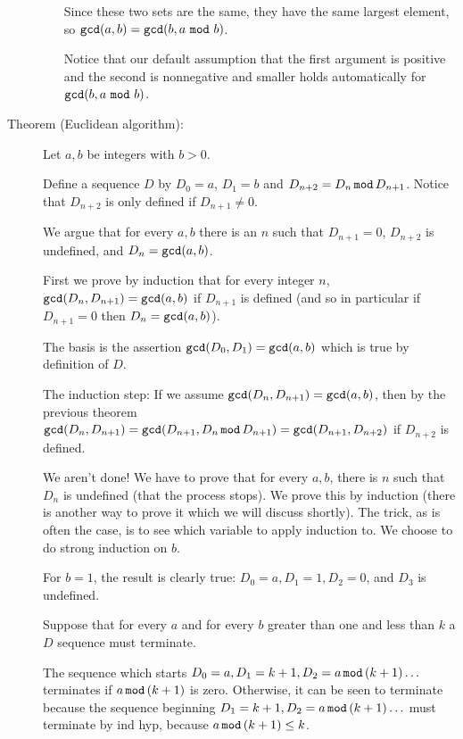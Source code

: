 \documentclass[12pt]{article}
\begin{document}
\begin{description}
\begin{enumerate}
Since these two sets are the same, they have the same largest element, so ${\tt gcd}(a,b) = {\tt gcd}(b,a\,\,{\tt mod} \,\, b)$.

Notice that our default assumption that the first argument is positive and the second is nonnegative and smaller holds automatically for ${\tt gcd}(b,a\,\,{\tt mod} \,\, b)$.
\end{enumerate}

\item[Theorem (Euclidean algorithm):]

Let $a,b$ be integers with $b >0$.

Define a sequence $D$ by $D_0=a$, $D_1=b$ and $D_{n+2}= D_n \,{\tt mod} \, D_{n+1}$.  Notice that $D_{n+2}$ is only defined if $D_{n+1} \neq 0$.

We argue that for every $a,b$ there is an $n$ such that $D_{n+1}=0$, $D_{n+2}$ is undefined, and $D_n = {\tt gcd}(a,b)$.


First we prove by induction that for every integer $n$, ${\tt gcd}(D_n,D_{n+1}) = {\tt gcd}(a,b)$ if $D_{n+1}$ is defined (and so in particular if $D_{n+1}=0$ then $D_n = {\tt gcd}(a,b)$).

The basis is the assertion ${\tt gcd}(D_0,D_{1}) = {\tt gcd}(a,b)$ which is true by definition of $D$.

The induction step: If we assume ${\tt gcd}(D_n,D_{n+1}) = {\tt gcd}(a,b)$, then by the previous theorem
${\tt gcd}(D_n,D_{n+1})= {\tt gcd}(D_{n+1},D_n\,{\tt mod} \,D_{n+1}) = {\tt gcd}(D_{n+1},D_{n+2})$ if $D_{n+2}$ is defined.

We aren't done!  We have to prove that for every $a,b$, there is $n$ such that $D_n$ is undefined (that the process stops).   We prove this by induction (there is another way to prove it which we will discuss shortly).  The trick, as is often the case, is to see which variable to apply induction to.  We choose to do strong induction on $b$.

For $b=1$, the result is clearly true:  $D_0 =a, D_1 = 1, D_2=0$, and $D_3$ is undefined.

Suppose that for every $a$ and for every $b$ greater than one and less than $k$ a $D$ sequence must terminate.

The sequence which starts $D_0=a, D_1 = k+1, D_2 = a \,{\tt mod} \, (k+1)\ldots$ terminates if $a \,{\tt mod} \, (k+1)$ is zero.  Otherwise, it can be seen to terminate because the sequence beginning $D_1 = k+1, D_2 = a \,{\tt mod} \, (k+1)\ldots$ must terminate by ind hyp, because
$a \,{\tt mod} \, (k+1) \leq k$.

\end{description}
\end{document}
